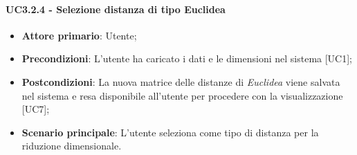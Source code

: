 \paragraph{UC3.2.4 - Selezione distanza di tipo Euclidea}
\begin{itemize}
	\item \textbf{Attore primario}: Utente;
	\item \textbf{Precondizioni}: L'utente ha caricato i dati e le dimensioni nel sistema [UC1];
	\item \textbf{Postcondizioni}: La nuova matrice delle distanze di \textit{Euclidea} viene salvata nel sistema e resa disponibile all'utente per procedere con la visualizzazione [UC7];
	\item \textbf{Scenario principale}: L'utente seleziona  come tipo di distanza per la riduzione dimensionale.
\end{itemize}
